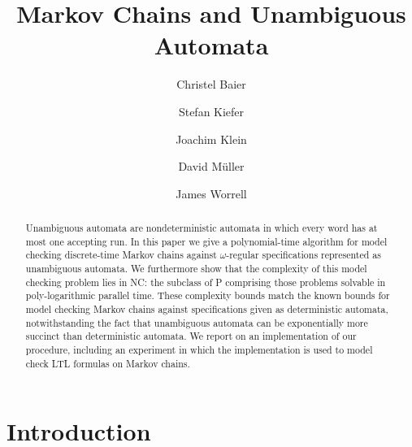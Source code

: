 \documentclass{elsarticle}
\begin{document}
\begin{abstract}
  Unambiguous automata are nondeterministic automata in which every
  word has at most one accepting run.  In this paper we give a
  polynomial-time algorithm for model checking discrete-time Markov
  chains against $\omega$-regular specifications represented as unambiguous
  automata.  We furthermore show that the complexity of this model
  checking problem lies in NC: the subclass of P comprising
  those problems solvable in poly-logarithmic parallel time.  These
  complexity bounds match the known bounds for model checking Markov
  chains against specifications given as deterministic automata,
  notwithstanding the fact that unambiguous automata can be
  exponentially more succinct than deterministic automata.  We report
  on an implementation of our procedure, including an experiment in
  which the implementation is used to model check LTL formulas on
  Markov chains.
\end{abstract}
\pagestyle{headings}  

\title{Markov Chains and Unambiguous Automata}


\author[tud]{Christel Baier\texorpdfstring{}{}}
\author[oxf]{Stefan Kiefer\texorpdfstring{}{}}
\author[tud]{Joachim Klein\texorpdfstring{}{}}
\author[tud]{David M\"uller\texorpdfstring{}{}}
\author[oxf]{James Worrell\texorpdfstring{}{}}





\address[tud]{Technische Universit\"at Dresden, Germany}
\address[oxf]{University of Oxford, United Kingdom}
\maketitle              


 
\section{Introduction}
\end{document}
